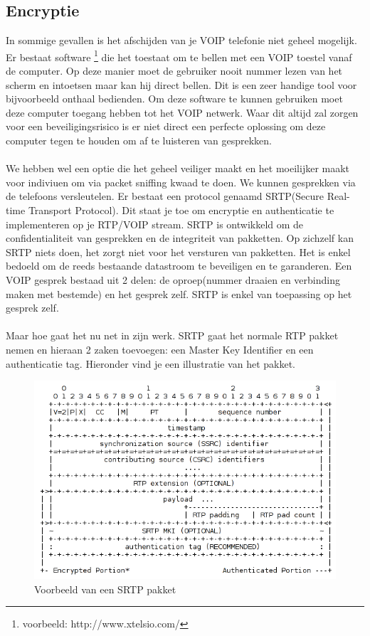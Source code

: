 \documentclass[pdftex,a4paper,12pt,twoside]{report}
\begin{document}
\subsection{Encryptie}
In sommige gevallen is het afschijden van je VOIP telefonie niet geheel mogelijk. Er bestaat software \footnote{voorbeeld: http://www.xtelsio.com/} die het toestaat om te bellen met een VOIP toestel vanaf de computer. Op deze manier moet de gebruiker nooit nummer lezen van het scherm en intoetsen maar kan hij direct bellen. Dit is een zeer handige tool voor bijvoorbeeld onthaal bedienden. Om deze software te kunnen gebruiken moet deze computer toegang hebben tot het VOIP netwerk. Waar dit altijd zal zorgen voor een beveiligingsrisico is er niet direct een perfecte oplossing om deze computer tegen te houden om af te luisteren van gesprekken. \\ \\
We hebben wel een optie die het geheel veiliger maakt en het moeilijker maakt voor indiviuen om via packet sniffing kwaad te doen. We kunnen gesprekken via de telefoons versleutelen. Er bestaat een protocol genaamd SRTP(Secure Real-time Transport Protocol). Dit staat je toe om encryptie en authenticatie te implementeren op je RTP/VOIP stream. SRTP is ontwikkeld om de confidentialiteit van gesprekken en de integriteit van pakketten. Op zichzelf kan SRTP niets doen, het zorgt niet voor het versturen van pakketten. Het is enkel bedoeld om de reeds bestaande datastroom te beveiligen en te garanderen. Een VOIP gesprek bestaad uit 2 delen: de oproep(nummer draaien en verbinding maken met bestemde) en het gesprek zelf. SRTP is enkel van toepassing op het gesprek zelf. \\ \\
Maar hoe gaat het nu net in zijn werk. SRTP gaat het normale RTP pakket nemen en hieraan 2 zaken toevoegen: een Master Key Identifier en een authenticatie tag. Hieronder vind je een illustratie van het pakket. 
\newpage

\begin{figure}[H]
\caption{Voorbeeld van een SRTP pakket \protect \footnotemark}
\includegraphics[scale=0.8]{img/SRTP}
\end{figure}
\end{document}
